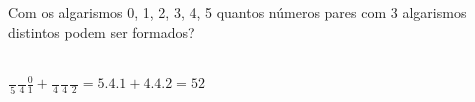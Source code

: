 \begin{ex}
 Com os algarismos 0, 1, 2, 3, 4, 5 quantos números pares com 3 algarismos distintos podem ser formados?
   \begin{sol}
       \phantom{A} \\
     $\frac{\phantom{A}}{5}\frac{\phantom{A}}{4}\frac{0}{1}+\frac{\phantom{A}}{4}\frac{\phantom{A}}{4}\frac{\phantom{A}}{2}= 5.4.1+4.4.2=52$
   \end{sol}
\end{ex}